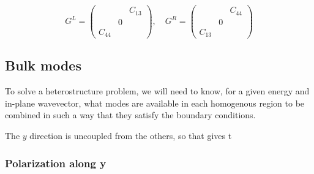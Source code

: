 \documentclass{article}
\begin{document}
\begin{equation}
  G^L= \begin{pmatrix}
    &  & C_{13}\\
    & 0& \\
    C_{44} & &
  \end{pmatrix}, \quad
  G^R= \begin{pmatrix}
    &  & C_{44}\\
    & 0& \\
    C_{13} & &
  \end{pmatrix}
\end{equation}
\subsection{Bulk modes}
To solve a heterostructure problem, we will need to know, for a given energy and in-plane wavevector, what modes are available in each homogenous region to be combined in such a way that they satisfy the boundary conditions.

The $y$ direction is uncoupled from the others, so that gives t
\subsubsection{Polarization along y}
\end{document}
